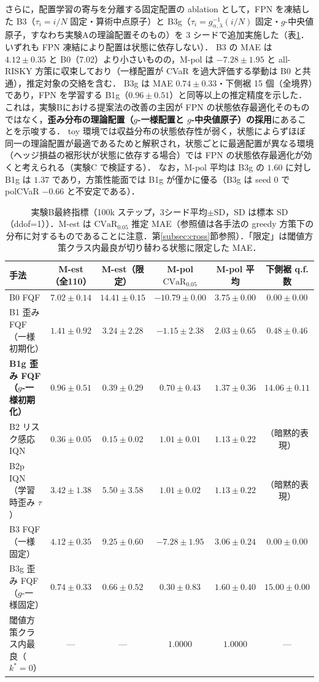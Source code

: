 \documentclass[a4paper,10pt]{jsarticle}
\theoremstyle{definition}
\newcommand{\CVaR}{\mathrm{CVaR}}
\begin{document}
さらに，配置学習の寄与を分離する固定配置の ablation として，FPN を凍結した B3（$\tau_i=i/N$ 固定・算術中点原子）と B3g（$\tau_i=g^{-1}_{\alpha,\lambda}(i/N)$ 固定・$g$-中央値原子，すなわち実験Aの理論配置そのもの）を 3 シードで追加実施した（表\ref{tab:B1}．いずれも FPN 凍結により配置は状態に依存しない）．
B3 の MAE は $4.12\pm0.35$ と B0（7.02）より小さいものの，M-pol は $-7.28\pm1.95$ と all-RISKY 方策に収束しており（一様配置が CVaR を過大評価する挙動は B0 と共通），推定対象の交絡を含む．
B3g は MAE $0.74\pm0.33$・下側裾 15 個（全境界）であり，FPN を学習する B1g（$0.96\pm0.51$）と同等以上の推定精度を示した．
これは，実験Bにおける提案法の改善の主因が FPN の状態依存最適化そのものではなく，\textbf{歪み分布の理論配置（$g$-一様配置と $g$-中央値原子）の採用}にあることを示唆する．
toy 環境では収益分布の状態依存性が弱く，状態によらずほぼ同一の理論配置が最適であるためと解釈され，状態ごとに最適配置が異なる環境（ヘッジ損益の裾形状が状態に依存する場合）では FPN の状態依存最適化が効くと考えられる（実験C で検証する）．
なお，M-pol 平均は B3g の $1.60$ に対し B1g は $1.37$ であり，方策性能面では B1g が僅かに優る（B3g は seed 0 で polCVaR $-0.66$ と不安定である）．

\begin{table}[htbp]
\centering
\caption{実験B最終指標（100k ステップ，3シード平均$\pm$SD，SD は標本 SD（ddof=1））．M-est は $\CVaR_{0.05}$ 推定 MAE（参照値は各手法の greedy 方策下の分布に対するものであることに注意．第\ref{subsec:cross}節参照）．「限定」は閾値方策クラス内最良が切り替わる状態に限定した MAE．}
\label{tab:B1}
\small
\setlength{\tabcolsep}{2.5pt}
\begin{tabular}{lccccc}
\toprule
手法 & M-est（全110） & M-est（限定） & M-pol $\CVaR_{0.05}$ & M-pol 平均 & 下側裾 q.f. 数\\
\midrule
B0 FQF & $7.02\pm0.14$ & $14.41\pm0.15$ & $-10.79\pm0.00$ & $3.75\pm0.00$ & $0.00\pm0.00$\\
B1 歪み FQF（一様初期化） & $1.41\pm0.92$ & $3.24\pm2.28$ & $-1.15\pm2.38$ & $2.03\pm0.65$ & $0.48\pm0.46$\\
\textbf{B1g 歪み FQF（$g$-一様初期化）} & $\mathbf{0.96\pm0.51}$ & $\mathbf{0.39\pm0.29}$ & $\mathbf{0.70\pm0.43}$ & $1.37\pm0.36$ & $\mathbf{14.06\pm0.11}$\\
B2 リスク感応 IQN & $0.36\pm0.05$ & $0.15\pm0.02$ & $1.01\pm0.01$ & $1.13\pm0.22$ & （暗黙的表現）\\
B2p IQN（学習時歪み $\tau$） & $3.42\pm1.38$ & $5.50\pm3.58$ & $1.01\pm0.02$ & $1.13\pm0.22$ & （暗黙的表現）\\
\midrule
B3 FQF（一様固定） & $4.12\pm0.35$ & $9.25\pm0.60$ & $-7.28\pm1.95$ & $3.06\pm0.24$ & $0.00\pm0.00$\\
B3g 歪み FQF（$g$-一様固定） & $0.74\pm0.33$ & $0.66\pm0.52$ & $0.30\pm0.83$ & $1.60\pm0.40$ & $15.00\pm0.00$\\
\midrule
閾値方策クラス内最良（$k^*=0$） & --- & --- & $1.0000$ & $1.0000$ & ---\\
\bottomrule
\end{tabular}
\end{table}
\end{document}
